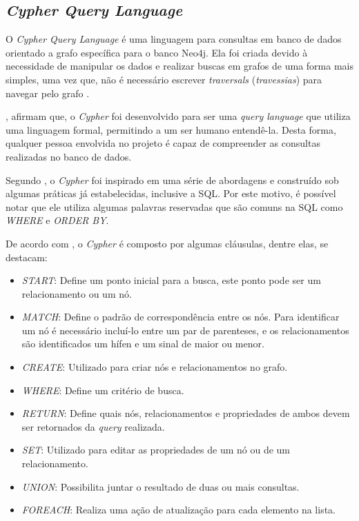 \subsection{\textit{Cypher Query Language}}

\par O \textit{Cypher Query Language} é uma linguagem para consultas em banco de dados orientado a grafo específica para o banco Neo4j. Ela foi criada devido à necessidade de manipular os dados e realizar buscas em grafos de uma forma mais simples, uma vez que, não é necessário escrever \textit{traversals} (\textit{travessias}) para navegar pelo grafo \cite{neo4j_team_manual}.


\par {}, afirmam que, o \textit{Cypher} foi desenvolvido para ser uma \textit{query language} que utiliza uma linguagem formal, permitindo a um ser humano entendê-la. Desta forma, qualquer pessoa envolvida no projeto é capaz de compreender as consultas realizadas no banco de dados. 

\par Segundo , o \textit{Cypher} foi inspirado em uma série de abordagens e construído sob algumas práticas já estabelecidas, inclusive a SQL. Por este motivo, é possível notar que ele utiliza algumas palavras reservadas que são comuns na SQL como \textit{WHERE} e \textit{ORDER BY}.

\par De acordo com , o \textit{Cypher} é composto por algumas cláusulas, dentre elas, se destacam:

\begin{itemize}
	\item \textit{START}: Define um ponto inicial para a busca, este ponto pode ser um relacionamento ou um nó.
	\item \textit{MATCH}: Define o padrão de correspondência entre os nós. Para identificar um nó é necessário incluí-lo entre um par de parenteses, e os relacionamentos são identificados um hífen e um sinal de maior ou menor.
	\item \textit{CREATE}: Utilizado para criar nós e relacionamentos no grafo.
	\item \textit{WHERE}: Define um critério de busca.
	\item \textit{RETURN}: Define quais nós, relacionamentos e propriedades de ambos devem ser retornados da \textit{query} realizada. 
	\item \textit{SET}: Utilizado para editar as propriedades de um nó ou de um relacionamento.
	\item \textit{UNION}: Possibilita juntar o resultado de duas ou mais consultas.
	\item \textit{FOREACH}: Realiza uma ação de atualização para cada elemento na lista.
\end{itemize} 

